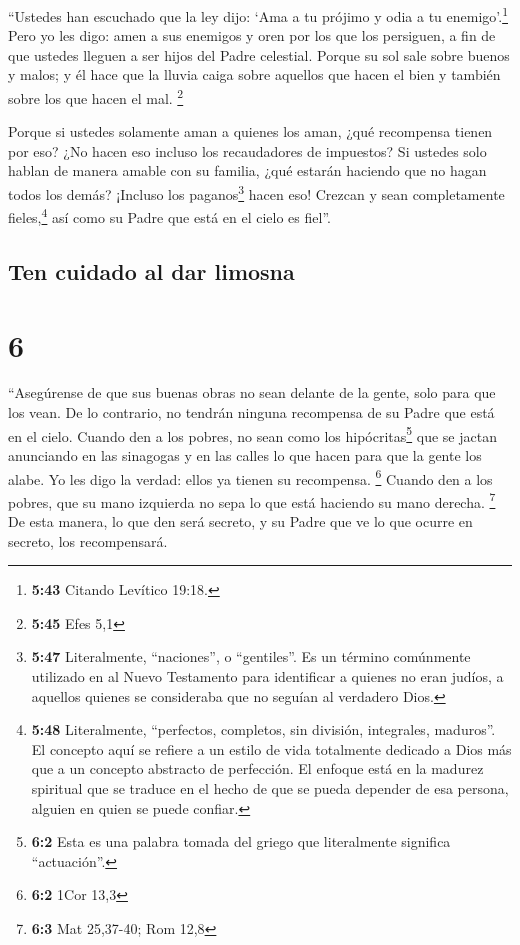  ``Ustedes han escuchado que la ley dijo: `Ama a tu
prójimo y odia a tu enemigo'.\footnote{\textbf{5:43} Citando Levítico
  19:18.}  Pero yo les digo: amen a sus enemigos y oren
por los que los persiguen,  a fin de que ustedes lleguen
a ser hijos del Padre celestial. Porque su sol sale sobre buenos y
malos; y él hace que la lluvia caiga sobre aquellos que hacen el bien y
también sobre los que hacen el mal. \footnote{\textbf{5:45} Efes 5,1}

 Porque si ustedes solamente aman a quienes los aman,
¿qué recompensa tienen por eso? ¿No hacen eso incluso los recaudadores
de impuestos?  Si ustedes solo hablan de manera amable
con su familia, ¿qué estarán haciendo que no hagan todos los demás?
¡Incluso los paganos\footnote{\textbf{5:47} Literalmente, ``naciones'',
  o ``gentiles''. Es un término comúnmente utilizado en al Nuevo
  Testamento para identificar a quienes no eran judíos, a aquellos
  quienes se consideraba que no seguían al verdadero Dios.} hacen eso!
 Crezcan y sean completamente fieles,\footnote{\textbf{5:48}
  Literalmente, ``perfectos, completos, sin división, integrales,
  maduros''. El concepto aquí se refiere a un estilo de vida totalmente
  dedicado a Dios más que a un concepto abstracto de perfección. El
  enfoque está en la madurez spiritual que se traduce en el hecho de que
  se pueda depender de esa persona, alguien en quien se puede confiar.}
así como su Padre que está en el cielo es fiel''.

\hypertarget{ten-cuidado-al-dar-limosna}{%
\subsection{Ten cuidado al dar
limosna}\label{ten-cuidado-al-dar-limosna}}

\hypertarget{section-5}{%
\section{6}\label{section-5}}

 ``Asegúrense de que sus buenas obras no sean delante de
la gente, solo para que los vean. De lo contrario, no tendrán ninguna
recompensa de su Padre que está en el cielo.  Cuando den a
los pobres, no sean como los hipócritas\footnote{\textbf{6:2} Esta es
  una palabra tomada del griego que literalmente significa
  ``actuación''.} que se jactan anunciando en las sinagogas y en las
calles lo que hacen para que la gente los alabe. Yo les digo la verdad:
ellos ya tienen su recompensa. \footnote{\textbf{6:2} 1Cor 13,3}
 Cuando den a los pobres, que su mano izquierda no sepa lo
que está haciendo su mano derecha. \footnote{\textbf{6:3} Mat 25,37-40;
  Rom 12,8}  De esta manera, lo que den será secreto, y su
Padre que ve lo que ocurre en secreto, los recompensará.

